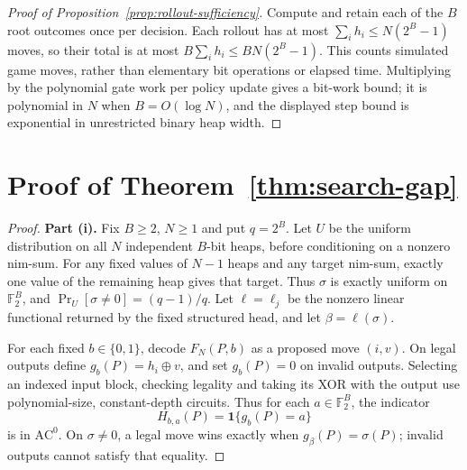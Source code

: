 \documentclass[twoside,11pt]{article}
\newcommand{\AC}{\mathrm{AC}}
\numberwithin{theorem}{section}
\numberwithin{equation}{section}
\begin{document}
\begin{proof}[Proof of Proposition~\ref{prop:rollout-sufficiency}]
Compute and retain each of the $B$ root outcomes once per decision. Each rollout has at most $\sum_i h_i\le N(2^B-1)$ moves, so their total is at most $B\sum_i h_i\le BN(2^B-1)$. This counts simulated game moves, rather than elementary bit operations or elapsed time. Multiplying by the polynomial gate work per policy update gives a bit-work bound; it is polynomial in $N$ when $B=O(\log N)$, and the displayed step bound is exponential in unrestricted binary heap width.
\end{proof}

\section{Proof of Theorem~\ref{thm:search-gap}}
\label{app:search-gap-proof}

\begin{proof}
\textbf{Part (i).} Fix $B\ge2$, $N\ge1$ and put $q=2^B$. Let $U$ be the uniform distribution on all $N$ independent $B$-bit heaps, before conditioning on a nonzero nim-sum. For any fixed values of $N-1$ heaps and any target nim-sum, exactly one value of the remaining heap gives that target. Thus $\sigma$ is exactly uniform on $\mathbb F_2^B$, and $\Pr_U[\sigma\ne0]=(q-1)/q$.
Let $\ell=\ell_j$ be the nonzero linear functional returned by the fixed structured head, and let $\beta=\ell(\sigma)$.

For each fixed $b\in\{0,1\}$, decode $F_N(P,b)$ as a proposed move $(i,v)$. On legal outputs define $g_b(P)=h_i\oplus v$, and set $g_b(P)=0$ on invalid outputs. Selecting an indexed input block, checking legality and taking its XOR with the output use polynomial-size, constant-depth circuits. Thus for each $a\in\mathbb F_2^B$, the indicator
\[
H_{b,a}(P)=\mathbf1\{g_b(P)=a\}
\]
is in $\AC^0$. On $\sigma\ne0$, a legal move wins exactly when $g_\beta(P)=\sigma(P)$; invalid outputs cannot satisfy that equality.


\end{proof}
\end{document}
